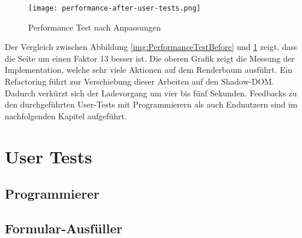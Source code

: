 \begin{figure}[!htb]
    \centering
    \texttt{[image: performance-after-user-tests.png]}
    \caption{Performance Test nach Anpassungen}
    \label{img:PerformanceTestAfter}
\end{figure}

Der Vergleich zwischen Abbildung \ref{img:PerformanceTestBefore} und \ref{img:PerformanceTestAfter} zeigt, dass die Seite um einen Faktor 13 besser ist.
Die oberen Grafik zeigt die Messung der Implementation, welche sehr viele Aktionen auf dem Renderbaum ausführt.
Ein Refactoring führt zur Verschiebung dieser Arbeiten auf den Shadow-DOM.
Dadurch verkürzt sich der Ladevorgang um vier bis fünf Sekunden.
Feedbacks zu den durchgeführten User-Tests mit Programmierern als auch Endnutzern sind im nachfolgenden Kapitel aufgeführt.


\section{User Tests}


\subsection{Programmierer}



\subsection{Formular-Ausfüller}





